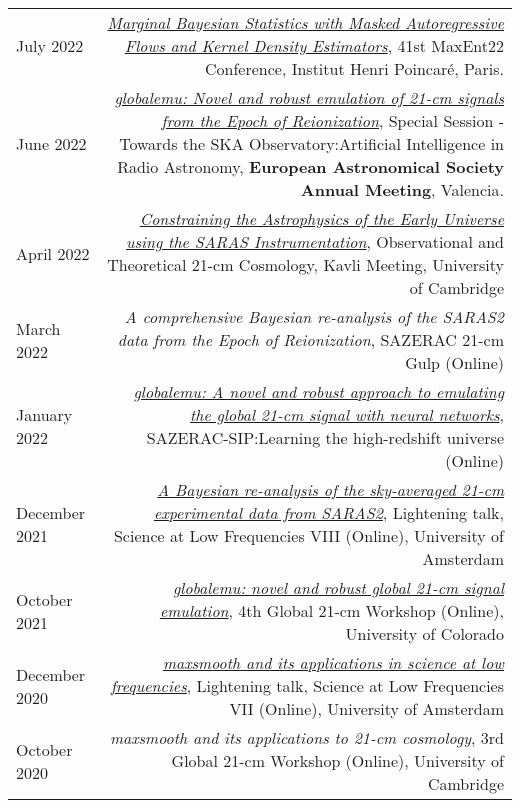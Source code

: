 \documentclass{article}
\begin{document}
\begin{tabular}{L!{\vrule}R}
	July 2022 & \href{https://github.com/htjb/Talks/blob/master/Talks/MaxEnt22_margarine_June_2022/MaxEnt_slides.pdf}{\textit{Marginal Bayesian Statistics with Masked Autoregressive Flows and Kernel Density Estimators}}, 41st MaxEnt22 Conference, Institut Henri Poincar\'e, Paris. \\
	June 2022 & \href{https://github.com/htjb/Talks/blob/master/Talks/ESA_globalemu_July_2022/AUDITORIUM\%203A_SS23a_0940_Bevins.pdf}{\textit{globalemu: Novel and robust emulation of 21-cm signals from the Epoch of Reionization}}, Special Session - Towards the SKA Observatory:Artificial Intelligence in Radio Astronomy, \textbf{European Astronomical Society Annual Meeting}, Valencia. \\
	April 2022 & \href{https://www.kicc.cam.ac.uk/events/kavli-science-themed-meetings/observational-and-theoretical-21-cm-cosmology}{\textit{Constraining the Astrophysics of the Early Universe using the SARAS Instrumentation}}, Observational and Theoretical 21-cm Cosmology, Kavli Meeting, University of Cambridge \\
	March 2022 & \textit{A comprehensive Bayesian re-analysis of the SARAS2 data from the Epoch of Reionization}, SAZERAC 21-cm Gulp (Online) \\
	January 2022 & \href{https://www.youtube.com/watch?v=BFwia93NuAc&list=PLp95u5tgS_YUkFaLATBQpLajJzO5ljN5u&index=5}{\textit{globalemu: A novel and robust approach to emulating the global 21-cm signal with neural networks}}, SAZERAC-SIP:Learning the high-redshift universe (Online) \\
	December 2021 & \href{https://www.youtube.com/watch?v=93KCp7rHcGA&list=PLZL7YmXBBHPDCyNfJcWwP78GgacY_Og4E&index=23}{\textit{A Bayesian re-analysis of the sky-averaged 21-cm experimental data from SARAS2}}, Lightening talk, Science at Low Frequencies VIII (Online), University of Amsterdam \\
	October 2021 & \href{https://www.youtube.com/watch?v=862NuVyF33k&list=PLF7c7ri2hrnGlwbn4JLc0PWbncSeARdTP&index=4}{\textit{globalemu: novel and robust global 21-cm signal emulation}}, 4th Global 21-cm Workshop (Online), University of Colorado \\
	December 2020 & \href{https://www.youtube.com/watch?v=Yw6_IInwTNE}{\textit{maxsmooth and its applications in science at low frequencies}}, Lightening talk, Science at Low Frequencies VII (Online), University of Amsterdam \\
	October 2020 & \textit{maxsmooth and its applications to 21-cm cosmology}, 3rd Global 21-cm Workshop (Online), University of Cambridge \\
\end{tabular}
\end{document}
